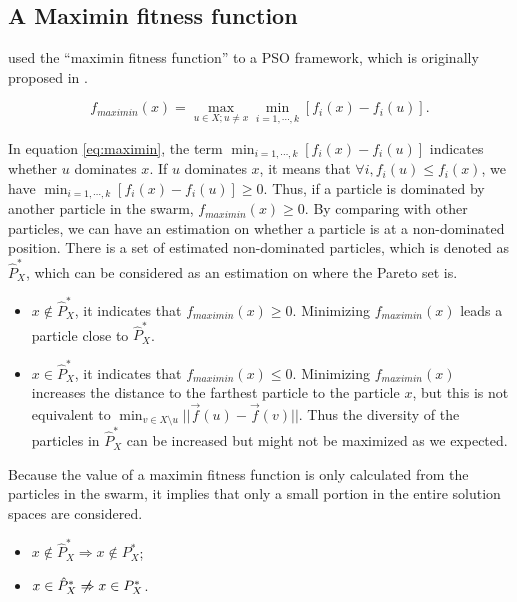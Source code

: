 \documentclass[12pt]{article}
\begin{document}
\subsection{A Maximin fitness function}

\cite{li2004better} used the ``maximin fitness function'' to a PSO framework, which is originally proposed in \cite{balling2003maximin}.
\begin{mydef}
\label{def:maximin}
\begin{equation}
\label{eq:maximin}
f_{maximin} (x) = \max_{u \in X; u \neq x} \min_{i = 1, \cdots , k} [ f_{i} (x) - f_{i} (u)  ].
\end{equation}
\end{mydef}
In equation \eqref{eq:maximin}, the term $ \min_{i = 1, \cdots , k} [ f_{i} (x) - f_{i} (u)  ] $ indicates whether $ u $ dominates $ x $.
If $ u $ dominates $ x $, it means that $ \forall i, f_{i} (u) \leq f_{i} (x) $, we have $ \min_{i = 1, \cdots , k} [ f_{i} (x) - f_{i} (u)  ] \geq 0 $.
Thus, if a particle is dominated by another particle in the swarm, $ f_{maximin} (x) \geq 0 $.
By comparing with other particles, we can have an estimation on whether a particle is at a non-dominated position.
There is a set of estimated non-dominated particles, which is denoted as $ \hat{P}^{*}_{X}  $, which can be considered as an estimation on where the Pareto set is.

\begin{itemize}
\item $ x \notin \hat{P}^{*}_{X} $, it indicates that $ f_{maximin} (x) \geq 0 $.
Minimizing $ f_{maximin} (x) $ leads a particle close to $ \hat{P}^{*}_{X} $.
\item $ x \in \hat{P}^{*}_{X} $, it indicates that $ f_{maximin} (x) \leq 0 $.
Minimizing $ f_{maximin} (x) $ increases the distance to the farthest particle to the particle $ x $, but this is not equivalent to $ \min_{v \in X \setminus u} || \vec{f}(u) - \vec{f}(v) ||  $.
Thus the diversity of the particles in $ \hat{P}^{*}_{X} $ can be increased but might not be maximized as we expected.
\end{itemize}

Because the value of a maximin fitness function is only calculated from the particles in the swarm, it implies that only a small portion in the entire solution spaces are considered.

\begin{propty} 
\label{prop:nondom_uncertainty}
\begin{itemize}
\item $ x \notin \hat{P}^{*}_{X} \Rightarrow x \notin P^{*}_{X} $;
\item $ x \in  \hat{P}^{*}_{X} \centernot\Rightarrow x \in P^{*}_{X} $.
\end{itemize}
\end{propty}
\end{document}
